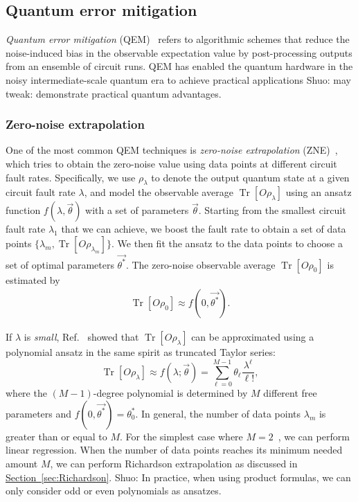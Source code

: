 \documentclass[aps,pra,reprint,groupedaddress,floatfix]{revtex4-2}
\renewcommand{\sec}[1]{\hyperref[sec:#1]{Section~\ref*{sec:#1}}}
\newcommand{\sz}[1]{{\color{blue} Shuo: #1}}
\begin{document}
\subsection{Quantum error mitigation}
\textit{Quantum error mitigation} (QEM)~\cite{cai2023quantum} refers to algorithmic schemes that reduce the noise-induced bias in the observable expectation value by post-processing outputs from an ensemble of circuit runs. QEM has enabled the quantum hardware in the noisy intermediate-scale quantum era to achieve practical applications \sz{may tweak: demonstrate practical quantum advantages}.

\subsubsection{Zero-noise extrapolation}
One of the most common QEM techniques is \textit{zero-noise extrapolation} (ZNE)~\cite{li2017efficient, PhysRevLett.119.180509}, which tries to obtain the zero-noise value using data points at different circuit fault rates. Specifically, we use $\rho_\lambda$ to denote the output quantum state at a given circuit fault rate $\lambda$, and model the observable average $\operatorname{Tr}[O\rho_\lambda]$ using an ansatz function $f(\lambda,\vec{\theta})$ with a set of parameters $\vec{\theta}$. Starting from the smallest circuit fault rate $\lambda_1$ that we can achieve, we boost the fault rate to obtain a set of data points $\{\lambda_m,\operatorname{Tr}[O\rho_{\lambda_m}]\}$. We then fit the ansatz to the data points to choose a set of optimal parameters $\vec{\theta^*}$. The zero-noise observable average $\operatorname{Tr}[O\rho_0]$ is estimated by
\begin{align*}
    \operatorname{Tr}[O\rho_0]\approx f(0,\vec{\theta^*}).
\end{align*}

If $\lambda$ is \textit{small}, Ref.~\cite{PhysRevLett.119.180509} showed that $\operatorname{Tr}[O\rho_\lambda]$ can be approximated using a polynomial ansatz in the same spirit as truncated Taylor series:
\begin{equation*}
\operatorname{Tr}\left[O \rho_\lambda\right] \approx f(\lambda ; \vec{\theta})=\sum_{\ell=0}^{M-1} \theta_{\ell} \frac{\lambda^{\ell}}{\ell!},
\end{equation*}
where the $(M-1)$-degree polynomial is determined by $M$ different free parameters and $f(0,\vec{\theta^*})={\theta_0^*}$. In general, the number of data points $\lambda_m$ is greater than or equal to $M$. For the simplest case where $M=2$~\cite{li2017efficient}, we can perform linear regression. When the number of data points reaches its minimum needed amount $M$, we can perform Richardson extrapolation as discussed in \sec{Richardson}. \sz{In practice, when using product formulas, we can only consider odd or even polynomials as ansatzes.}
\end{document}
